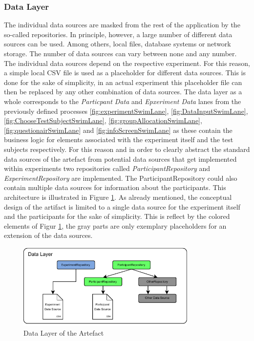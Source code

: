 \subsubsection{Data Layer}

The individual data sources are masked from the rest of the application by the so-called repositories. In principle, however, a large number of different data sources can be used. Among others, local files, database systems or network storage.  The number of data sources can vary between none and any number. The individual data sources depend on the respective experiment. For this reason, a simple local CSV file is used as a placeholder for different data sources. This is done for the sake of simplicity, in an actual experiment this placeholder file can then be replaced by any other combination of data sources. %
The data layer as a whole corresponds to the \textit{Particpant Data} and \textit{Epxeriment Data} lanes from the previously defined processes \ref{fig:experimentSwimLane}, \ref{fig:DataInputSwimLane}, \ref{fig:ChooseTestSubjectSwimLane}, \ref{fig:groupAllocationSwimLane}, \ref{fig:questionairSwimLane} and \ref{fig:infoScreenSwimLane} as these contain the business logic for elements associated with the experiment itself and the test subjects respectively. For this reason and in order to clearly abstract the standard data sources of the artefact from potential data sources that get implemented within experiments two repositories called \textit{ParticipantRepository} and \textit{ExperimentRepository} are implemented. The ParticipantRepository could also contain multiple data sources for information about the participants. This architecture is illustrated in Figure \ref{fig:dataLayer}. As already mentioned, the conceptual design of the artifact is limited to a single data source for the experiment itself and the participants for the sake of simplicity. This is reflect by the colored elements of Figur \ref{fig:dataLayer}, the gray parts are only exemplary placeholders for an extension of the data sources.

\begin{figure}[htbp]
    \centering
    \includegraphics[width=0.79\textwidth, keepaspectratio]{content/05_design_and_dev_artefacts/DataLayer.drawio.pdf}
    \caption{Data Layer of the Artefact}    
    \label{fig:dataLayer}
\end{figure}

